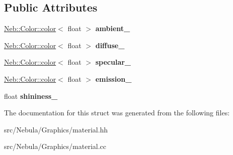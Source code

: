 \subsection*{Public Attributes}
\begin{DoxyCompactItemize}
\item 
\hypertarget{structNeb_1_1material_1_1raw_ac89b7d0fbb78c1b32cce884ccc02ee7c}{\hyperlink{classNeb_1_1Color_1_1color}{Neb\-::\-Color\-::color}$<$ float $>$ {\bfseries ambient\-\_\-}}\label{structNeb_1_1material_1_1raw_ac89b7d0fbb78c1b32cce884ccc02ee7c}

\item 
\hypertarget{structNeb_1_1material_1_1raw_a89affeb24a5f68aed606b9a10a9200da}{\hyperlink{classNeb_1_1Color_1_1color}{Neb\-::\-Color\-::color}$<$ float $>$ {\bfseries diffuse\-\_\-}}\label{structNeb_1_1material_1_1raw_a89affeb24a5f68aed606b9a10a9200da}

\item 
\hypertarget{structNeb_1_1material_1_1raw_a5c95594cfb7b0d09b7e9451f44b73148}{\hyperlink{classNeb_1_1Color_1_1color}{Neb\-::\-Color\-::color}$<$ float $>$ {\bfseries specular\-\_\-}}\label{structNeb_1_1material_1_1raw_a5c95594cfb7b0d09b7e9451f44b73148}

\item 
\hypertarget{structNeb_1_1material_1_1raw_a5b5e60a7d67b5eca9f553ba3d017f1e7}{\hyperlink{classNeb_1_1Color_1_1color}{Neb\-::\-Color\-::color}$<$ float $>$ {\bfseries emission\-\_\-}}\label{structNeb_1_1material_1_1raw_a5b5e60a7d67b5eca9f553ba3d017f1e7}

\item 
\hypertarget{structNeb_1_1material_1_1raw_ada9810b67306db0c24bdfcc0b08d500a}{float {\bfseries shininess\-\_\-}}\label{structNeb_1_1material_1_1raw_ada9810b67306db0c24bdfcc0b08d500a}

\end{DoxyCompactItemize}


The documentation for this struct was generated from the following files\-:\begin{DoxyCompactItemize}
\item 
src/\-Nebula/\-Graphics/material.\-hh\item 
src/\-Nebula/\-Graphics/material.\-cc\end{DoxyCompactItemize}
